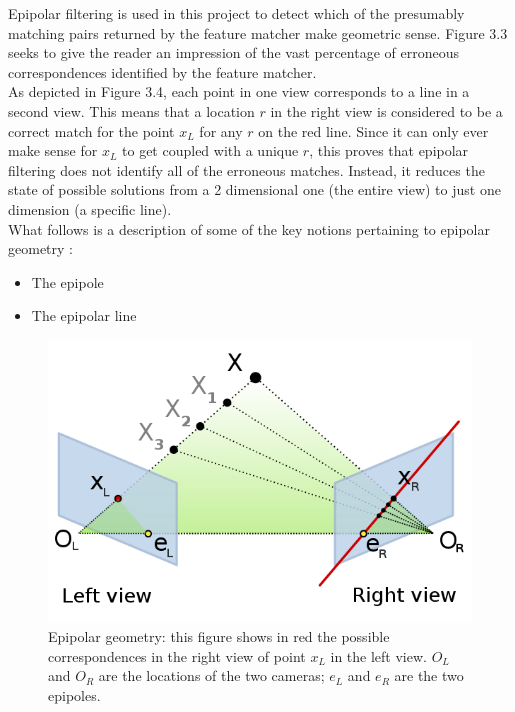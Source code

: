 \documentclass[12pt,a4paper,twoside,openright]{report}
\begin{document}
Epipolar filtering is used in this project to detect which of the presumably matching pairs returned by the feature matcher make geometric sense. Figure 3.3 seeks to give the reader an impression of the vast percentage of erroneous correspondences identified by the feature matcher.\\
\newline
As depicted in Figure 3.4, each point in one view corresponds to a line in a second view. This means that a location $r$ in the right view is considered to be a correct match for the point $x_{L}$ for any $r$ on the red line. Since it can only ever make sense for $x_{L}$ to get coupled with a unique $r$, this proves that epipolar filtering does not identify all of the erroneous matches. Instead, it reduces the state of possible solutions from a 2 dimensional one (the entire view) to just one dimension (a specific line).\\
\linebreak
What follows is a description of some of the key notions pertaining to epipolar geometry \cite[ch.9]{Hartley+2003}:
\begin{itemize}
\item {The epipole}
\item {The epipolar line}
\end{itemize}

\begin{figure}
\begin{center}
\includegraphics[scale=0.7]{figs/Epipolar_geometry.png}
\caption{Epipolar geometry: this figure shows in red the possible correspondences in the right view of point $x_{L}$ in the left view. $O_{L}$ and $O_{R}$ are the locations of the two cameras; $e_{L}$ and $e_{R}$ are the two epipoles.}
\end{center}
\end{figure}
\end{document}
